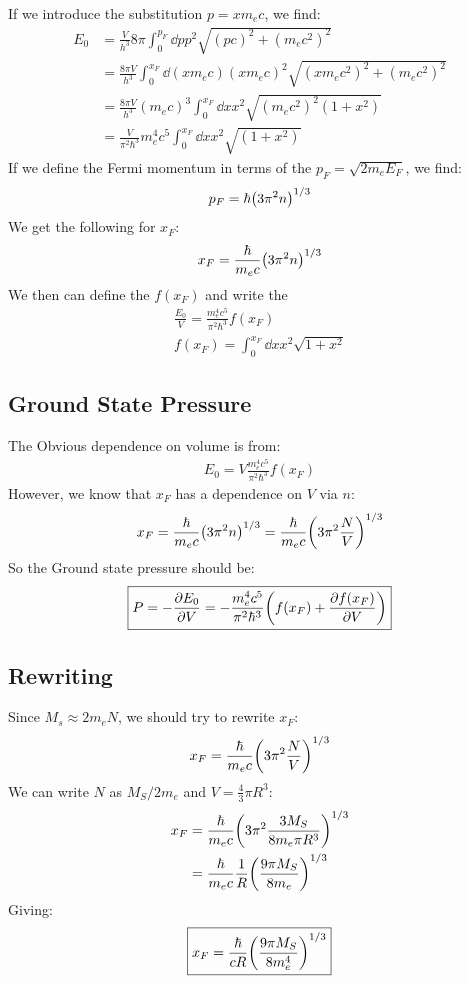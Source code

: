 \documentclass[12pt]{article}
\begin{document}
If we introduce the substitution $p=xm_ec$, we find:
\begin{align*}
  E_0&=\frac{V}{h^3}8\pi\int_0^{p_F}\dd{p}p^2\sqrt{(pc)^2+(m_ec^2)^2}\\
  &=\frac{8\pi V}{h^3}
  \int_0^{x_F}\dd{(xm_ec)}(xm_ec)^2\sqrt{(xm_ec^2)^2+(m_ec^2)^2}\\
  &=\frac{8\pi V}{h^3}(m_ec)^3\int_0^{x_F}\dd{x}x^2\sqrt{(m_ec^2)^2(1+x^2)}\\
  &=\frac{V}{\pi^2\hbar^3}m_e^4c^5\int_0^{x_F}\dd{x}x^2\sqrt{(1+x^2)}
\end{align*}
If we define the Fermi momentum in terms of the $p_F=\sqrt{2m_eE_F}$, we find:
\begin{align*}
  p_F=\hbar\qty(3\pi^2n)^{1/3}
\end{align*}
We get the following for $x_F$:
\begin{align*}
  x_F=\frac{\hbar}{m_ec}\qty(3\pi^2n)^{1/3}
\end{align*}
We then can define the $f(x_F)$ and write the 
\begin{equation}
  \boxed{
    \begin{gathered}
      \frac{E_0}{V}=\frac{m_e^4c^5}{\pi^2\hbar^3}f(x_F)\\
      f(x_F)=\int_0^{x_F}\dd{x}x^2\sqrt{1+x^2}
    \end{gathered}
  }
\end{equation}
\subsection{Ground State Pressure}
The Obvious dependence on volume is from:
\begin{align*}
  E_0=\boxed{V}\frac{m_e^4c^5}{\pi^2\hbar^3}f(x_F)
\end{align*}
However, we know that $x_F$ has a dependence on $V$ via $n$:
\begin{align*}
  x_F=\frac{\hbar}{m_ec}\qty(3\pi^2n)^{1/3}=
  \frac{\hbar}{m_ec}\qty(3\pi^2\frac{N}{V})^{1/3}
\end{align*}
So the Ground state pressure should be:
\begin{align}
  \boxed{
    P=-\pdv{E_0}{V}=-\frac{m_e^4c^5}{\pi^2\hbar^3}\qty(f(x_F)+\pdv{f(x_F)}{V})
  }
\end{align}
\subsection{Rewriting}
Since $M_s\approx2m_eN$, we should try to rewrite $x_F$:
\begin{align*}
  x_F=\frac{\hbar}{m_ec}\qty(3\pi^2 \frac{N}{V})^{1/3}
\end{align*}
We can write $N$ as $M_S/2m_e$ and $V=\frac43\pi R^3$:
\begin{align*}
  x_F&=\frac{\hbar}{m_ec}\qty(3\pi^2\frac{3M_S}{8m_e\pi R^3})^{1/3}\\
  &=\frac{\hbar}{m_ec}\frac1R\qty(\frac{9\pi M_S}{8m_e})^{1/3}
\end{align*}
Giving:
\begin{align*}
  \boxed{x_F=\frac{\hbar}{cR}\qty(\frac{9\pi M_S}{8m_e^4})^{1/3}}
\end{align*}
\end{document}
